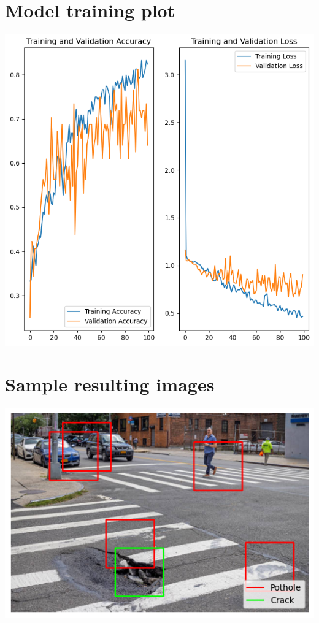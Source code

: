 \documentclass[12pt, letterpaper, twoside]{article}
\begin{document}
\section{Model training plot}\label{app:model_plot}

\includegraphics{model_plot.png}

\section{Sample resulting images}\label{app:result_image}

\includegraphics{result_1.png}
\end{document}
